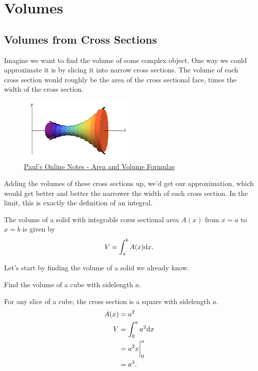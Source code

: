 \section{Volumes}
\subsection{Volumes from Cross Sections}
Imagine we want to find the volume of some complex object.
One way we could approximate it is by slicing it into narrow cross sections.
The volume of each cross section would roughly be the area of the cross sectional face, times the width of the cross section.

\begin{figure}[H]
	\label{volumes}
	\centering
	\includegraphics[width=0.5\textwidth]{./applications_integrals/volumes.png}
	\caption{\hyperref{https://tutorial.math.lamar.edu/classes/calci/Area\_Volume\_Formulas.aspx}{}{}{Paul's Online Notes - Area and Volume Formulas}}
\end{figure}
\noindent
Adding the volumes of these cross sections up, we'd get our approximation, which would get better and better the narrower the width of each cross section.
In the limit, this is exactly the definition of an integral.

\begin{definition}
	The volume of a solid with integrable corss sectional area $A(x)$ from $x=a$ to $x=b$ is given by
	\begin{equation*}
		V = \int_{a}^{b}{A(x)\mathrm{d} x}.
	\end{equation*}
\end{definition}

\noindent
Let's start by finding the volume of a solid we already know.
\begin{example}
	Find the volume of a cube with sidelength $a$.
\end{example}
For any slice of a cube, the cross section is a square with sidelength $a$.
\begin{align*}
	A(x) &= a^2 \\
	V &= \int_{0}^{a}{a^2\mathrm{d} x} \\
	&= a^2x\biggr\rvert_0^a \\
	&= a^3.
\end{align*}

